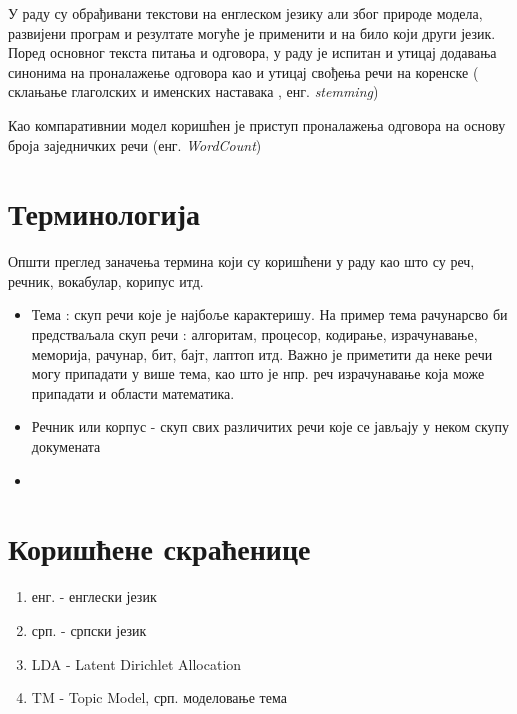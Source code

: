 У раду су обрађивани текстови на енглеском језику али због природе модела, развијени програм и резултате могуће је применити и на било који други језик. Поред основног текста питања и одговора, у раду је испитан и утицај додавања синонима на проналажење одговора као и утицај свођења речи на коренске ( склањање глаголских и именских наставака , енг. \textit{stemming})

Као компаративнии модел коришћен је приступ проналажења одговора на основу броја заједничких речи (енг. \textit{WordCount})%


\section{Терминологија}

Општи преглед заначења термина који су коришћени у раду као што су реч, речник, вокабулар, корипус итд.

\begin{itemize} 
\item Тема : скуп речи које је најбоље карактеришу. На пример тема рачунарсво би предстваљала скуп речи : алгоритам, процесор, кодирање, израчунавање, меморија, рачунар, бит, бајт, лаптоп итд. Важно је приметити да неке речи могу припадати у више тема, као што је нпр. реч израчунавање која може припадати и области математика.
\item Речник или корпус - скуп свих различитих речи које се јављају у неком скупу докумената
\item 
 \end{itemize}

\section{Коришћене скраћенице}
\begin{enumerate}
\item енг. - енглески језик
\item срп. - српски језик
\item LDA - Latent Dirichlet Allocation
\item TM - Topic Model, срп. моделовање тема
\end{enumerate}
